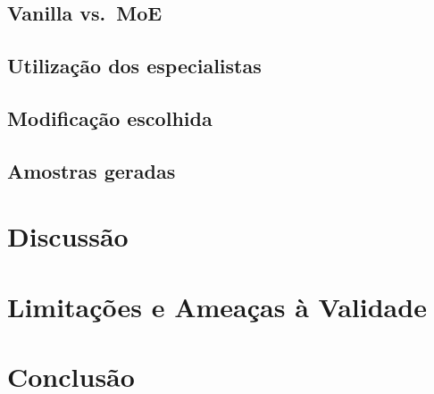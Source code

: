 \documentclass[12pt]{article}
\begin{document}
\subsection{Vanilla vs.\ MoE}

\subsection{Utilização dos especialistas}

\subsection{Modificação escolhida}

\subsection{Amostras geradas}

\section{Discussão}\label{sec:discussao}

\section{Limitações e Ameaças à Validade}\label{sec:limitacoes}

\section{Conclusão}\label{sec:conclusao}
\end{document}
